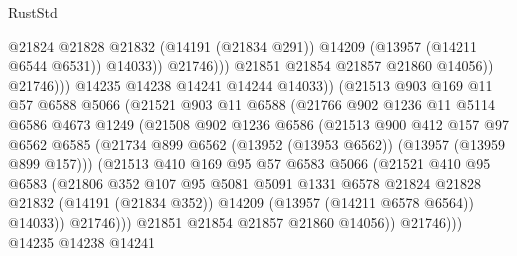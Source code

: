 \begin{lexlean}{RustStd}
\begin{coremodule}
                                    @21824
                                    @21828
                                    @21832
                                    (@14191 (@21834 @291))
                                    @14209
                                    (@13957 (@14211 @6544 @6531))
                                    @14033))
                                @21746)))
                          @21851
                          @21854
                          @21857
                          @21860
                          @14056))
                      @21746)))
                @14235
                @14238
                @14241
                @14244
                @14033))
            (@21513
              @903
              @169
              @11
              @57
              @6588
              @5066
              (@21521
                @903
                @11
                @6588
                (@21766
                  @902
                  @1236
                  @11
                  @5114
                  @6586
                  @4673
                  @1249
                  (@21508
                    @902
                    @1236
                    @6586
                    (@21513
                      @900
                      @412
                      @157
                      @97
                      @6562
                      @6585
                      (@21734 @899 @6562 (@13952 (@13953 @6562)) (@13957 (@13959 @899 @157)))
                      (@21513
                        @410
                        @169
                        @95
                        @57
                        @6583
                        @5066
                        (@21521
                          @410
                          @95
                          @6583
                          (@21806
                            @352
                            @107
                            @95
                            @5081
                            @5091
                            @1331
                            @6578
                            @21824
                            @21828
                            @21832
                            (@14191 (@21834 @352))
                            @14209
                            (@13957 (@14211 @6578 @6564))
                            @14033))
                        @21746)))
                  @21851
                  @21854
                  @21857
                  @21860
                  @14056))
              @21746)))
        @14235
        @14238
        @14241

\end{coremodule}
\end{lexlean}
